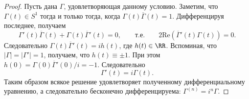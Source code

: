 \documentclass[12pt,a4paper]{article}
\renewcommand{\Re}{\mathrm{Re}}
\begin{document}
    \begin{proof}
        Пусть дана $\Gamma$, удовлетворяющая данному условию. Заметим, что $\Gamma(t) \in S^1$ тогда и только тогда, когда $\Gamma(t) \overline{\Gamma}(t) = 1$. Дифференцируя последнее, получаем
        \[
            \Gamma'(t) \overline{\Gamma}(t) + \Gamma(t) \overline{\Gamma}'(t) = 0,
            \qquad \text{т.е.} \qquad
            2\Re(\overline{\Gamma}'(t)\Gamma(t)) = 0.
        \]
        Следовательно $\Gamma(t)\overline{\Gamma}'(t) = i h(t)$, где $h(t) \in \RR$. Вспоминая, что $|\Gamma| = |\Gamma'| = 1$, получаем, что $h(t) \equiv \pm 1$. При этом $h(0) = \Gamma(0)\overline{\Gamma}'(0)/i = -1$. Следовательно
        \[\Gamma'(t) = i \Gamma(t).\]
        Таким образом всякое решение удовлетворяет полученному дифференциальному уравнению, а следовательно бесконечно дифференцируема: $\Gamma^{(n)} = i^n \Gamma$.
        

\end{proof}
\end{document}
